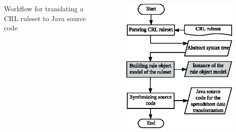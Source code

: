 \documentclass[10pt]{beamer}
\begin{document}
\begin{frame}
\begin{columns}[t]
\small Workflow for translating a CRL ruleset to Java source code
\begin{figure}
\includegraphics[width=0.95\linewidth]{crl2j_wf_part2}
\end{figure}
\end{columns}
\end{frame}
\end{document}
